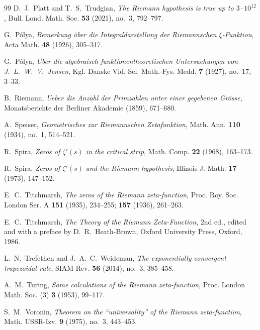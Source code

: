 \documentclass[11pt,a4paper,reqno]{amsart}
\theoremstyle{definition}
\theoremstyle{remark}
\numberwithin{equation}{section}
\begin{document}
\begin{thebibliography}{99}
D.~J.~Platt and T.~S.~Trudgian, \emph{The Riemann hypothesis is true up to $3\cdot 10^{12}$}, Bull. Lond. Math. Soc. \textbf{53} (2021), no.~3, 792--797.

G.~P\'olya, \emph{Bemerkung \"uber die Integraldarstellung der Riemannschen $\xi$-Funktion}, Acta Math. \textbf{48} (1926), 305--317.

G.~P\'olya, \emph{\"Uber die algebraisch-funktionentheoretischen Untersuchungen von J.~L.~W.~V.~Jensen}, Kgl. Danske Vid. Sel. Math.-Fys. Medd. \textbf{7} (1927), no.~17, 3--33.

B.~Riemann, \emph{Ueber die Anzahl der Primzahlen unter einer gegebenen Gr\"osse}, Monatsberichte der Berliner Akademie (1859), 671--680.

A.~Speiser, \emph{Geometrisches zur Riemannschen Zetafunktion}, Math. Ann. \textbf{110} (1934), no.~1, 514--521.

R.~Spira, \emph{Zeros of $\zeta'(s)$ in the critical strip}, Math. Comp. \textbf{22} (1968), 163--173.

R.~Spira, \emph{Zeros of $\zeta'(s)$ and the Riemann hypothesis}, Illinois J. Math. \textbf{17} (1973), 147--152.

E.~C.~Titchmarsh, \emph{The zeros of the Riemann zeta-function}, Proc. Roy. Soc. London Ser. A \textbf{151} (1935), 234--255; \textbf{157} (1936), 261--263.

E.~C.~Titchmarsh, \emph{The Theory of the Riemann Zeta-Function}, 2nd ed., edited and with a preface by D.~R.~Heath-Brown, Oxford University Press, Oxford, 1986.

L.~N.~Trefethen and J.~A.~C.~Weideman, \emph{The exponentially convergent trapezoidal rule}, SIAM Rev. \textbf{56} (2014), no.~3, 385--458.

A.~M.~Turing, \emph{Some calculations of the Riemann zeta-function}, Proc. London Math. Soc. (3) \textbf{3} (1953), 99--117.

S.~M.~Voronin, \emph{Theorem on the ``universality'' of the Riemann zeta-function}, Math. USSR-Izv. \textbf{9} (1975), no.~3, 443--453.

\end{thebibliography}
\end{document}
